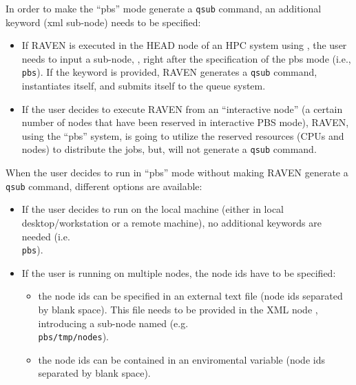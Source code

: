 \begin{itemize}
\begin{itemize}
      In order to make the ``pbs'' mode generate a \texttt{qsub} command, an
      additional keyword (xml sub-node) needs to be specified:
         \begin{itemize}
         \item If RAVEN is executed in the HEAD node of an HPC system using
           \cite{PBS}, the user needs to input a sub-node, ,
           right after the specification of the pbs mode (i.e.,\\
             \texttt{pbs}).
             If the keyword is provided, RAVEN generates a \texttt{qsub}
             command, instantiates itself, and submits itself to the queue
             system.
           \item If the user decides to execute RAVEN from an ``interactive
             node'' (a certain number of nodes that have been reserved in
             interactive PBS mode), RAVEN, using the ``pbs'' system, is going to
             utilize the reserved resources (CPUs and nodes) to distribute the
             jobs, but, will not generate a \texttt{qsub} command.
         \end{itemize}
     When the user decides to run in ``pbs'' mode without making RAVEN generate
     a \texttt{qsub} command, different options are available:
      \begin{itemize}
           \item If the user decides to run on the local machine (either in
             local desktop/workstation or a remote machine), no additional
             keywords are needed (i.e.\\
             \texttt{pbs}).
           \item If the user is running on multiple nodes, the node ids have
             to be specified:
           \begin{itemize}
              \item the node ids can be specified in an external text file
                (node ids separated by blank space).
                This file needs to be provided in the XML node ,
                introducing a sub-node named  (e.g.\\
\texttt{pbs}\texttt{/tmp/nodes}).
              \item the node ids can be contained in an enviromental variable
                (node ids separated by blank space).

\end{itemize}
\end{itemize}
\end{itemize}
\end{itemize}
